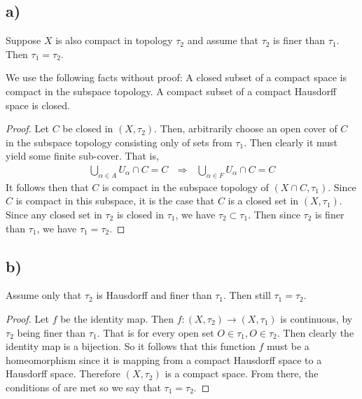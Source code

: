 \documentclass{article}
\theoremstyle{definition}
\begin{document}
    \subsection*{a)}
        \begin{mdframed}
            Suppose $X$ is also compact in topology $\tau_2$ and assume that $\tau_2$ is finer than $\tau_1$.
            Then $\tau_1 = \tau_2$.
        \end{mdframed}
        We use the following facts without proof: A closed subset of a compact space is compact in the subspace
        topology. A compact subset of a compact Hausdorff space is closed.
        \begin{proof}
            Let $C$ be closed in $(X, \tau_2)$. Then, arbitrarily choose an open cover of $C$ in the subspace topology 
            consisting only of sets from $\tau_1$. Then clearly it must yield some finite sub-cover. That is,
            \begin{align}
                \bigcup_{\alpha \in A}U_\alpha \cap C = C \ \ \ \Longrightarrow \ \ \ \bigcup_{\alpha \in F}U_\alpha \cap C = C
            \end{align}
            It follows then that $C$ is compact in the subspace topology of $(X \cap C, \tau_1)$. Since $C$ is compact
            in this subspace, it is the case that $C$ is a closed set in $(X, \tau_1)$.
            Since any closed set in $\tau_2$ is closed in $\tau_1$, we have $\tau_2 \subset \tau_1$. Then since 
            $\tau_2$ is finer than $\tau_1$, we have $\tau_1 = \tau_2$.
        \end{proof}
    \subsection*{b)}
        \begin{mdframed}
            Assume only that $\tau_2$ is Hausdorff and finer than $\tau_1$. Then still $\tau_1 = \tau_2$.
        \end{mdframed}
        \begin{proof}
            Let $f$ be the identity map. Then $f: (X,\tau_2) \rightarrow (X,\tau_1)$ is continuous, by $\tau_2$ being finer
            than $\tau_1$. That is for every open set $O \in \tau_1, O \in \tau_2$. Then clearly the identity map
            is a bijection. So it follows that this function $f$ must be a homeomorphism since it is mapping from a
            compact Hausdorff space to a Hausdorff space. Therefore $(X, \tau_2)$ is a compact space. From there,
            the conditions of  are met so we say that $\tau_1 = \tau_2$.
        \end{proof}
\end{document}
